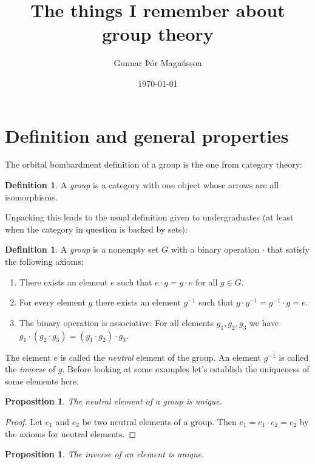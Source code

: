 \documentclass[11pt]{article}
\author{Gunnar Þór Magnússon}
\date{\today}
\title{The things I remember about group theory}
\newtheorem{prop}[theo]{Proposition}
\theoremstyle{definition}
\newtheorem{defi}[theo]{Definition}
\begin{document}
\maketitle


\section{Definition and general properties}

The orbital bombardment definition of a group is the one from category theory:

\begin{defi}
A \emph{group} is a category with one object whose arrows are all isomorphisms.
\end{defi}

Unpacking this leads to the usual definition given to undergraduates (at least
when the category in question is backed by sets):

\begin{defi}
A \emph{group} is a nonempty set $G$ with a binary operation $\cdot$ that satisfy the following axioms:
\begin{enumerate}
\item
There exists an element $e$ such that $e \cdot g = g \cdot e$ for all $g \in G$.

\item
For every element $g$ there exists an element $g^{-1}$ such that $g \cdot g^{-1} = g^{-1} \cdot g = e$.

\item
The binary operation is associative: For all elements $g_1, g_2, g_3$ we have $g_1 \cdot (g_2 \cdot g_3) = (g_1 \cdot g_2) \cdot g_3$.
\end{enumerate}
\end{defi}

The element $e$ is called the \emph{neutral} element of the group.
An element $g^{-1}$ is called the \emph{inverse} of $g$.
Before looking at some examples let's establish the uniqueness of some elements
here.


\begin{prop}
The neutral element of a group is unique.
\end{prop}

\begin{proof}
Let $e_1$ and $e_2$ be two neutral elements of a group.
Then
$e_1 = e_1 \cdot e_2 = e_2$
by the axioms for neutral elements.
\end{proof}


\begin{prop}
The inverse of an element is unique.
\end{prop}
\end{document}
